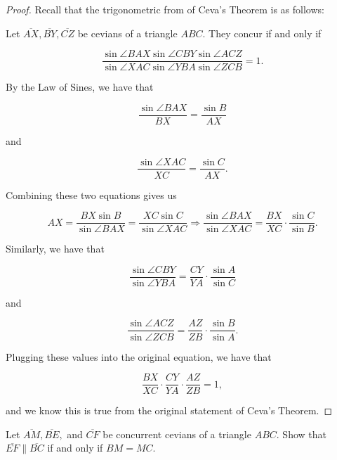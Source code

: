 \documentclass[letterpaper,oneside]{scrartcl}
\begin{document}
\begin{proof}  Recall that the trigonometric from of Ceva's Theorem is as follows:

  Let $\overline{AX}, \overline{BY}, \overline{CZ}$ be cevians of a triangle $ABC.$ They concur if and only if

  $$\frac{\sin \angle BAX \sin \angle CBY \sin \angle ACZ}{\sin \angle XAC \sin \angle YBA \sin \angle ZCB} = 1.$$

  By the Law of Sines, we have that

  $$\frac{\sin\angle BAX}{BX} = \frac{\sin B}{AX}$$

  and

  $$\frac{\sin\angle XAC}{XC} = \frac{\sin C}{AX}.$$

  Combining these two equations gives us

  $$AX = \frac{BX \sin B}{\sin\angle BAX}=\frac{XC \sin C}{\sin\angle XAC} \Rightarrow \frac{\sin \angle BAX}{\sin \angle XAC} = \frac{BX}{XC} \cdot \frac{\sin C}{\sin B}.$$

  Similarly, we have that

  $$\frac{\sin \angle CBY}{\sin \angle YBA} = \frac{CY}{YA}\cdot \frac{\sin A}{\sin C} $$

  and

  $$
    \frac{\sin \angle ACZ}{\sin \angle ZCB} = \frac{AZ}{ZB}\cdot \frac{\sin B}{\sin A}. $$

  Plugging these values into the original equation, we have that

  $$\frac{BX}{XC}\cdot \frac{CY}{YA} \cdot \frac{AZ}{ZB} = 1,$$

  and we know this is true from the original statement of Ceva's Theorem.
\end{proof}

\begin{problem*}
  [3.6]
  Let $\overline{AM}, \overline{BE},$ and $\overline{CF}$ be concurrent cevians of a triangle $ABC.$ Show that $\overline{EF} \parallel \overline{BC}$ if and only if $BM = MC.$
\end{problem*}
\end{document}
